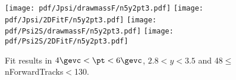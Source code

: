 \begin{figure}[H]
\begin{center}
\texttt{[image: pdf/Jpsi/drawmassF/n5y2pt3.pdf]}
\texttt{[image: pdf/Jpsi/2DFitF/n5y2pt3.pdf]}
\vspace*{-0.5cm}
\texttt{[image: pdf/Psi2S/drawmassF/n5y2pt3.pdf]}
\texttt{[image: pdf/Psi2S/2DFitF/n5y2pt3.pdf]}
\vspace*{-0.5cm}
\end{center}
\caption{Fit results in $4\gevc<\pt<6\gevc$, $2.8<y<3.5$ and 48$\leq$nForwardTracks$<$130.}
\label{Fitn5y2pt3}
\end{figure}
